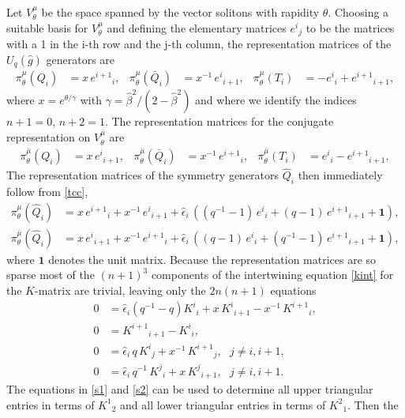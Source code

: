 \documentclass[a4paper,12pt]{article}
\newcommand{\hb}{\hat{\beta}}
\newcommand{\uqgh}{U_q(\hat{g})}
\newcommand{\one}{\mathbf{1}}
\newcommand{\mub}{\bar{\mu}}
\numberwithin{equation}{section}
\begin{document}
Let $V^\mu_\theta$ be the space spanned by the vector solitons
with rapidity $\theta$. Choosing a suitable basis for
$V^\mu_\theta$ and defining the elementary matrices $e^{i}{}_j$ to
be the matrices with a 1 in the i-th row and the j-th column, the
representation matrices of the $\uqgh$ generators are
\begin{align}
  \pi^\mu_\theta(Q_i)&=x\,e^{i+1}{}_i,&
  \pi^\mu_\theta(\bar{Q}_i)&=x^{-1}\,e^{i}{}_{i+1},&
  \pi^\mu_\theta(T_i)&=-e^{i}{}_i+e^{i+1}{}_{i+1},
\end{align}
where $x=e^{\theta/\gamma}$ with $\gamma=\hb^2/(2-\hb^2)$ and
where we identify the indices $n+1=0$, $n+2=1$. The representation
matrices for the conjugate representation on $V^{\mub}_\theta$ are
\begin{align}
  \pi^{\mub}_\theta(Q_i)&=x\,e^{i}{}_{i+1},&
  \pi^{\mub}_\theta(\bar{Q}_i)&=x^{-1}\,e^{i+1}{}_{i},&
  \pi^{\mub}_\theta(T_i)&=e^{i}{}_i-e^{i+1}{}_{i+1},
\end{align}
The representation matrices of the symmetry generators $\hat{Q}_i$
then immediately follow from \eqref{tcc},
\begin{align}
  \pi^\mu_\theta(\hat{Q}_i)&=x\,e^{i+1}{}_i+
  x^{-1}\,e^{i}{}_{i+1}+
  \hat{\epsilon}_i\,((q^{-1}-1)\,e^{i}{}_i+(q-1)\,e^{i+1}{}_{i+1}+\one),\\
  \pi^{\mub}_\theta(\hat{Q}_i)&=x\,e^{i}{}_{i+1}+
  x^{-1}\,e^{i+1}{}_{i}+
  \hat{\epsilon}_i\,((q-1)\,e^{i}{}_i+(q^{-1}-1)\,e^{i+1}{}_{i+1}+\one),
\end{align}
where $\one$ denotes the unit matrix. Because the representation
matrices are so sparse
most of the $(n+1)^3$ components of the intertwining equation
\eqref{kint} for the $K$-matrix are trivial, leaving only the
$2n(n+1)$ equations
\begin{align}
  0&=\hat{\epsilon}_i(q^{-1}-q)K^i{}_i+x\,K^i{}_{i+1}-x^{-1}\,K^{i+1}{}_i,
  \label{s3}\\
  0&=K^{i+1}{}_{i+1}-K^i{}_i,\label{s4}\\
  0&=\hat{\epsilon}_i\,q\,K^i{}_j+x^{-1}\,K^{i+1}{}_j,~~~j\neq
  i,i+1,\label{s1}\\
  0&=\hat{\epsilon}_i\,q^{-1}\,K^j{}_i+x\,K^j{}_{i+1},~~~j\neq
  i,i+1.\label{s2}
\end{align}
The equations in \eqref{s1} and \eqref{s2} can be used to
determine all upper triangular entries in terms of $K^1{}_2$ and
all lower triangular entries in terms of $K^2{}_1$. Then the
\end{document}

